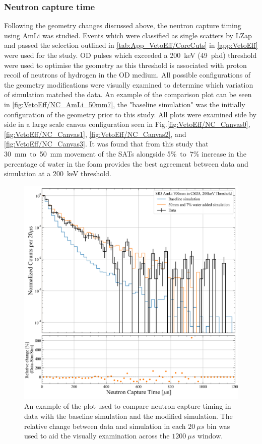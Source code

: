 \subsubsection{Neutron capture time}\label{sec:VetoEff/NCT}
Following the geometry changes discussed above, the neutron capture timing using AmLi was studied. Events which were classified as single scatters by LZap and passed the selection outlined in \autoref{tab:App_VetoEff/CoreCuts} in \autoref{app:VetoEff} were used for the study. OD pulses which exceeded a 200~keV (49~phd) threshold were used to optimise the geometry as this threshold is associated with proton recoil of neutrons of hydrogen in the OD medium.
All possible configurations of the geometry modifications were visually examined to determine which variation of simulation matched the data. An example of the comparison plot can be seen in \autoref{fig:VetoEff/NC_AmLi_50mm7}, the "baseline simulation" was the initially configuration of the geometry prior to this study. All plots were examined side by side in a large scale canvas configuration seen in Fig.\ref{fig:VetoEff/NC_Canvas0}, \ref{fig:VetoEff/NC_Canvas1}, \ref{fig:VetoEff/NC_Canvas2}, and \ref{fig:VetoEff/NC_Canvas3}. It was found that from this study that 30~mm~to~50~mm movement of the SATs alongside 5\%~to~7\% increase in the percentage of water in the foam provides the best agreement between data and simulation at a 200~keV threshold.
\begin{figure}[!ht]
	\centering
	\includegraphics[width=0.7\linewidth]{figures/VetoEfficiency/movedSAT50mm_7percentWater_AmLi_CSD3_Z700mm_200keV_Ratio.png}
	\caption{An example of the plot used to compare neutron capture timing in data with the baseline simulation and the modified simulation. The relative change between data and simulation in each $20~\mu s$ bin was used to aid the visually examination across the $1200~\mu s$ window.}
	\label{fig:VetoEff/NC_AmLi_50mm7}
\end{figure}

